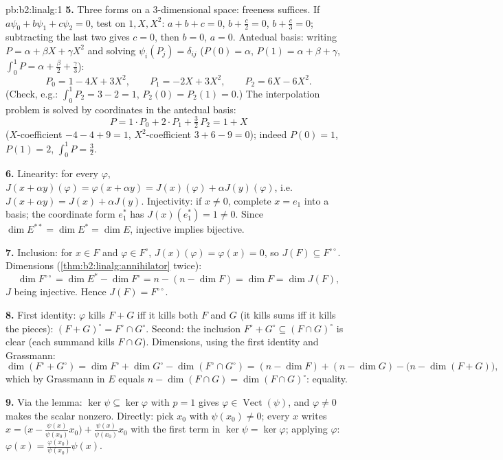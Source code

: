 \begin{solution}{pb:b2:linalg:1}
\textbf{5.} Three forms on a $3$-dimensional space: freeness
suffices. If $a\psi_0 + b\psi_1 + c\psi_2 = 0$, test on $1, X,
X^2$: $a + b + c = 0$, $b + \frac c2 = 0$, $b + \frac c3 = 0$;
subtracting the last two gives $c = 0$, then $b = 0$, $a = 0$.
Antedual basis: writing $P = \alpha + \beta X + \gamma X^2$ and
solving $\psi_i(P_j) = \delta_{ij}$ ($P(0) = \alpha$, $P(1) =
\alpha + \beta + \gamma$, $\int_0^1 P = \alpha + \frac\beta2 +
\frac\gamma3$):
\[
P_0 = 1 - 4X + 3X^2, \qquad
P_1 = -2X + 3X^2, \qquad
P_2 = 6X - 6X^2 .
\]
(Check, e.g.: $\int_0^1 P_2 = 3 - 2 = 1$, $P_2(0) = P_2(1) = 0$.)
The interpolation problem is solved by coordinates in the
antedual basis:
\[
P = 1\cdot P_0 + 2\cdot P_1 + \tfrac32\, P_2 = 1 + X
\]
($X$-coefficient $-4 - 4 + 9 = 1$, $X^2$-coefficient $3 + 6 - 9 =
0$); indeed $P(0) = 1$, $P(1) = 2$, $\int_0^1 P = \frac32$.

\textbf{6.} Linearity: for every $\varphi$, $J(x + \alpha
y)(\varphi) = \varphi(x + \alpha y) = J(x)(\varphi) + \alpha
J(y)(\varphi)$, i.e.\ $J(x + \alpha y) = J(x) + \alpha J(y)$. Injectivity: if $x \neq 0$,
complete $x = e_1$ into a basis; the coordinate form $e_1^*$ has
$J(x)(e_1^*) = 1 \neq 0$. Since $\dim E^{**} = \dim E^* = \dim
E$, injective implies bijective.

\textbf{7.} Inclusion: for $x \in F$ and $\varphi \in F^\circ$,
$J(x)(\varphi) = \varphi(x) = 0$, so $J(F) \subseteq
F^{\circ\circ}$. Dimensions
(\cref{thm:b2:linalg:annihilator} twice):
\[
\dim F^{\circ\circ} = \dim E^* - \dim F^\circ
= n - (n - \dim F) = \dim F = \dim J(F),
\]
$J$ being injective. Hence $J(F) = F^{\circ\circ}$.

\textbf{8.} First identity: $\varphi$ kills $F + G$ iff it kills
both $F$ and $G$ (it kills sums iff it kills the pieces):
$(F+G)^\circ = F^\circ \cap G^\circ$. Second: the inclusion
$F^\circ + G^\circ \subseteq (F \cap G)^\circ$ is clear (each
summand kills $F \cap G$). Dimensions, using the first identity
and Grassmann:
\[
\dim(F^\circ + G^\circ) = \dim F^\circ + \dim G^\circ -
\dim(F^\circ \cap G^\circ)
= (n - \dim F) + (n - \dim G) - \bigl(n - \dim(F +
G)\bigr),
\]
which by Grassmann in $E$ equals $n - \dim(F \cap G) = \dim(F
\cap G)^\circ$: equality.

\textbf{9.} Via the lemma: $\ker\psi \subseteq \ker\varphi$ with
$p = 1$ gives $\varphi \in \operatorname{Vect}(\psi)$, and
$\varphi \neq 0$ makes the scalar nonzero. Directly: pick $x_0$
with $\psi(x_0) \neq 0$; every $x$ writes $x = \bigl(x -
\frac{\psi(x)}{\psi(x_0)}x_0\bigr) + \frac{\psi(x)}{\psi(x_0)}
x_0$ with the first term in $\ker\psi = \ker\varphi$; applying
$\varphi$: $\varphi(x) = \frac{\varphi(x_0)}{\psi(x_0)}\psi(x)$.


\end{solution}
